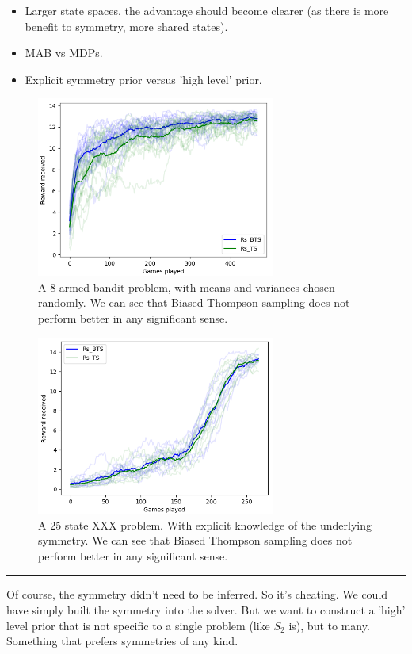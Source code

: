 \begin{itemize}
	\item Larger state spaces, the advantage should become clearer (as there is more benefit to symmetry, more shared states).
	\item MAB vs MDPs.
	\item Explicit symmetry prior versus 'high level' prior.
\end{itemize}


\begin{figure}[h!]
  \centering
  \includegraphics[width=0.7\textwidth,height=0.35\textheight]{../../pictures/figures/mab-9-ts.png}
  \caption{A 8 armed bandit problem, with means and variances chosen randomly.
	We can see that Biased Thompson sampling does not perform better in any significant sense.}
\end{figure}

\begin{figure}[h!]
  \centering
  \includegraphics[width=0.7\textwidth,height=0.35\textheight]{../../pictures/figures/mdp-25-explicit.png}
  \caption{A 25 state XXX problem. With explicit knowledge of the underlying symmetry.
	We can see that Biased Thompson sampling does not perform better in any significant sense.}
\end{figure}

\begin{center}\rule{0.5\linewidth}{\linethickness}\end{center}

Of course, the symmetry didn't need to be inferred. So it's cheating.
We could have simply built the symmetry into the solver. But we want to
construct a 'high' level prior that is not specific to a single problem (like $S_2$ is), but
to many. Something that prefers symmetries of any kind.
